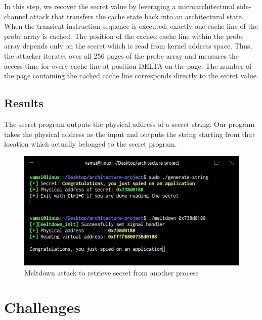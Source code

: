 \documentclass[runningheads]{llncs}
\begin{document}
In this step, we recover the secret value by leveraging a microarchitectural side-channel attack that transfers the cache state back into an architectural state. When the transient instruction sequence is executed, exactly one cache line of the probe array is cached. The position of the cached cache line within the probe array depends only on the secret which is read from kernel address space. Thus, the attacker iterates over all 256 pages of the probe array and measures the access time for every cache line at position DELTA on the page. The number of the page containing the cached cache line corresponds directly to the secret value.

\subsection{Results}
The secret program outputs the physical address of a secret string. Our program takes the physical address as the input and outputs the string starting from that location which actually belonged to the secret program.

\begin{figure}[H]
\centerline{\includegraphics[scale=0.6]{images/secret.png}}
\caption{Meltdown attack to retrieve secret from another process} \label{getvalue}
\end{figure}

\section{Challenges}
\end{document}
